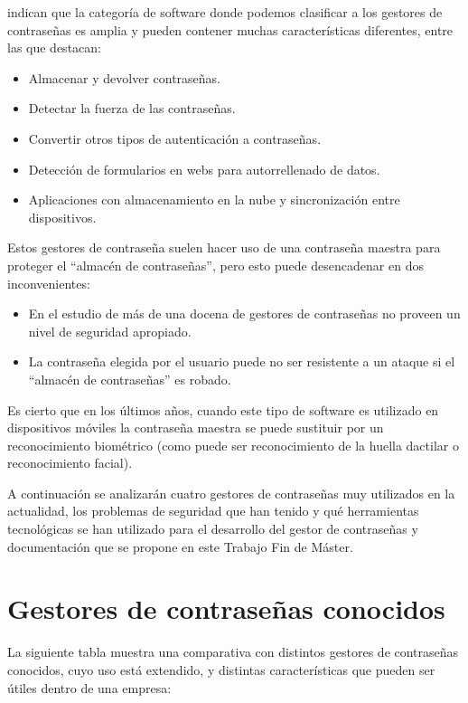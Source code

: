 \documentclass{\ClassPath/viu-tfm-template}
\begin{document}
\textcite{tapas} indican que la categoría de software donde podemos clasificar a los gestores de contraseñas es amplia y pueden contener muchas características diferentes, entre las que destacan:

\begin{itemize}
    \item Almacenar y devolver contraseñas.
    \item Detectar la fuerza de las contraseñas.
    \item Convertir otros tipos de autenticación a contraseñas.
    \item Detección de formularios en webs para autorrellenado de datos.
    \item Aplicaciones con almacenamiento en la nube y sincronización entre dispositivos.
\end{itemize}


Estos gestores de contraseña suelen hacer uso de una contraseña maestra para proteger el “almacén de contraseñas”, pero esto puede desencadenar en dos inconvenientes:


\begin{itemize}
    \item En el estudio de \textcite{belenko2012secure} más de una docena de gestores de contraseñas no proveen un nivel de seguridad apropiado.

    \item La contraseña elegida por el usuario puede no ser resistente a un ataque si el “almacén de contraseñas” es robado.
\end{itemize}


Es cierto que en los últimos años, cuando este tipo de software es utilizado en dispositivos móviles la contraseña maestra se puede sustituir por un reconocimiento biométrico (como puede ser reconocimiento de la huella dactilar o reconocimiento facial).


A continuación se analizarán cuatro gestores de contraseñas muy utilizados en la actualidad, los problemas de seguridad que han tenido y qué herramientas tecnológicas se han utilizado para el desarrollo del gestor de contraseñas y documentación que se propone en este Trabajo Fin de Máster.

\section{Gestores de contraseñas conocidos}

La siguiente tabla muestra una comparativa con distintos gestores de contraseñas conocidos, cuyo uso está extendido,  y distintas características que pueden ser útiles dentro de una empresa:
\end{document}
